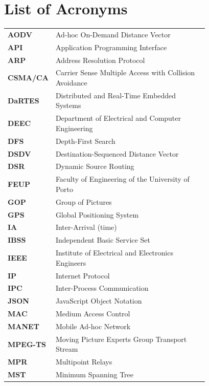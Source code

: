 \chapter*{List of Acronyms}

\begin{longtable}{@{}l@{\hspace{1.5em}}p{0.78\linewidth}@{}}
\textbf{AODV}      & Ad-hoc On-Demand Distance Vector \\
\textbf{API}       & Application Programming Interface \\
\textbf{ARP}       & Address Resolution Protocol \\
\textbf{CSMA/CA}   & Carrier Sense Multiple Access with Collision Avoidance \\
\textbf{DaRTES}    & Distributed and Real-Time Embedded Systems \\
\textbf{DEEC}      & Department of Electrical and Computer Engineering \\
\textbf{DFS}       & Depth-First Search \\
\textbf{DSDV}      & Destination-Sequenced Distance Vector \\
\textbf{DSR}       & Dynamic Source Routing \\
\textbf{FEUP}      & Faculty of Engineering of the University of Porto \\
\textbf{GOP}       & Group of Pictures \\
\textbf{GPS}       & Global Positioning System \\
\textbf{IA}        & Inter-Arrival (time) \\
\textbf{IBSS}      & Independent Basic Service Set \\
\textbf{IEEE}      & Institute of Electrical and Electronics Engineers \\
\textbf{IP}        & Internet Protocol \\
\textbf{IPC}       & Inter-Process Communication \\
\textbf{JSON}      & JavaScript Object Notation \\
\textbf{MAC}       & Medium Access Control \\
\textbf{MANET}     & Mobile Ad-hoc Network \\
\textbf{MPEG-TS}   & Moving Picture Experts Group Transport Stream \\
\textbf{MPR}       & Multipoint Relays \\
\textbf{MST}       & Minimum Spanning Tree \\

\end{longtable}
